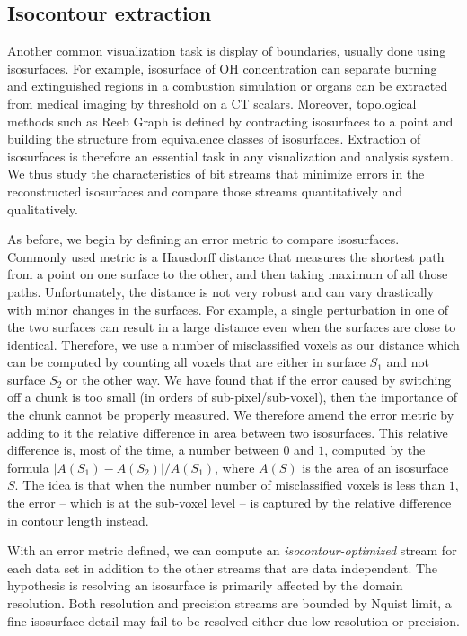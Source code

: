 
\subsection{Isocontour extraction}
\label{sec:isocontour}
Another common visualization task is display of boundaries, usually done using isosurfaces. For example,
isosurface of OH concentration can separate burning and extinguished regions in a combustion simulation or
organs can be extracted from medical imaging by threshold on a CT scalars. Moreover, topological methods such as Reeb Graph is
defined by contracting isosurfaces to a point and building the structure from equivalence classes of isosurfaces.
Extraction of isosurfaces is therefore an essential task in any
visualization and analysis system. We thus study the characteristics of bit streams that
minimize errors in the reconstructed isosurfaces and compare those streams quantitatively and qualitatively.

As before, we begin by defining an error metric to compare isosurfaces. Commonly used metric is a Hausdorff
distance that measures the shortest path from a point on one surface to the other, and then taking maximum
of all those paths. Unfortunately, the distance is not very robust and can vary drastically with minor changes
in the surfaces. For example, a single perturbation in one of the two surfaces
can result in a large distance even when the surfaces are close to identical. Therefore, we use a number of
misclassified voxels as our distance which can be computed by counting all voxels that are either in surface $S_1$
and not surface $S_2$ or the other way. We have found that if the error caused by
switching off a chunk is too small (in orders of sub-pixel/sub-voxel), then the importance of the
chunk cannot be properly measured. We therefore amend the error metric by adding to it the relative
difference in area between two isosurfaces. This relative difference is, most of the time, a number
between $0$ and $1$, computed by the formula $|A(S_1)-A(S_2)|/A(S_1)$, where $A(S)$ is the area of
an isosurface $S$. The idea is that when the number number of misclassified voxels is less than $1$, the
error -- which is at the sub-voxel level -- is captured by the relative difference in contour length
instead.

With an error metric defined, we can compute an \emph{isocontour-optimized} stream for each data set in addition
to the other streams that are data independent. The hypothesis is resolving an isosurface is primarily affected
by the domain resolution.
Both resolution and precision streams are bounded by Nquist limit, a fine isosurface detail may fail
to be resolved either due low resolution or precision.

